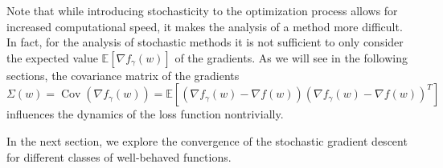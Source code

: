 \documentclass[12pt]{article}
\theoremstyle{definition}
\numberwithin{equation}{section}
\newcommand{\ev}[1]{\mathbb{E}\left[{#1}\right]}
\DeclareMathOperator{\Cov}{Cov}
\begin{document}
Note that while introducing stochasticity to the optimization process allows for increased computational speed, it makes the analysis of a method more difficult. In fact, for the analysis of stochastic methods it is not sufficient to only consider the expected value $\ev{\nabla f_{\gamma}(w)}$ of the gradients. As we will see in the following sections, the covariance matrix of the gradients $\Sigma(w) = \Cov(\nabla f_\gamma(w)) = \ev{(\nabla f_{\gamma}(w) - \nabla f(w)){(\nabla f_{\gamma}(w) - \nabla f(w))}^T}$ influences the dynamics of the loss function nontrivially.


In the next section, we explore the convergence of the stochastic gradient descent for different classes of well-behaved functions.
\end{document}
